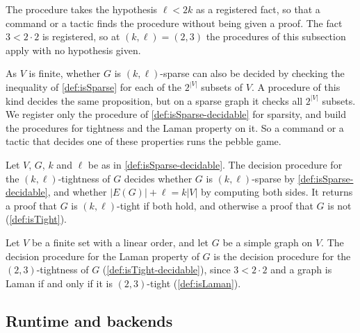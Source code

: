 \begin{fmlnote}
  The procedure takes the hypothesis $\ell < 2k$ as a registered fact,
  so that a command or a tactic finds the procedure without being given
  a proof. The fact $3 < 2 \cdot 2$ is registered, so at
  $(k, \ell) = (2, 3)$ the procedures of this subsection apply with no
  hypothesis given.
\end{fmlnote}

\begin{remark}
  \label{rem:decidable-runtime}
  As $V$ is finite, whether $G$ is $(k, \ell)$-sparse can also be
  decided by checking the inequality of \cref{def:isSparse} for each of
  the $2^{|V|}$ subsets of $V$. A procedure of this kind decides the same
  proposition, but on a sparse graph it checks all $2^{|V|}$ subsets. We
  register only the procedure of \cref{def:isSparse-decidable} for
  sparsity, and build the procedures for tightness and the Laman
  property on it. So a command or a tactic that decides one of these
  properties runs the pebble game.
\end{remark}

\begin{definition}
  \label{def:isTight-decidable}
  \leanok
  Let $V$, $G$, $k$ and $\ell$ be as in \cref{def:isSparse-decidable}.
  The decision procedure for the $(k, \ell)$-tightness of $G$ decides
  whether $G$ is $(k, \ell)$-sparse by \cref{def:isSparse-decidable},
  and whether $|E(G)| + \ell = k|V|$ by computing both sides. It returns
  a proof that $G$ is $(k, \ell)$-tight if both hold, and otherwise a
  proof that $G$ is not (\cref{def:isTight}).
\end{definition}

\begin{definition}
  \label{def:isLaman-decidable}
  \leanok
  Let $V$ be a finite set with a linear order, and let $G$ be a simple
  graph on $V$. The decision procedure for the Laman property of $G$ is
  the decision procedure for the $(2, 3)$-tightness of $G$
  (\cref{def:isTight-decidable}), since $3 < 2 \cdot 2$ and a graph is
  Laman if and only if it is $(2, 3)$-tight (\cref{def:isLaman}).
\end{definition}

\subsection{Runtime and backends}
\label{sec:executable-backends}

